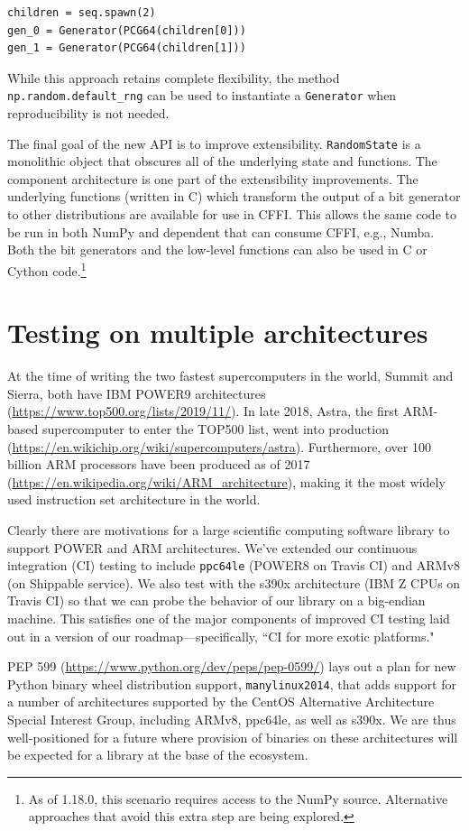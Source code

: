 \begin{lstlisting}
children = seq.spawn(2)
gen_0 = Generator(PCG64(children[0]))
gen_1 = Generator(PCG64(children[1]))
\end{lstlisting}

While this approach retains complete flexibility, the method
\texttt{np.random.default\_rng} can be used to instantiate a \texttt{Generator} when
reproducibility is not needed.

The final goal of the new API is to improve extensibility. \texttt{RandomState} is
a monolithic object that obscures all of the underlying state and functions. The
component architecture is one part of the extensibility improvements. The
underlying functions (written in C) which transform the output of a bit
generator to other distributions are available for use in CFFI. This allows the
same code to be run in both NumPy and dependent that can consume CFFI, e.g.,
Numba. Both the bit generators and the low-level functions can also be used in C
or Cython code.\footnote{As of 1.18.0, this scenario requires access to the
NumPy source. Alternative approaches that avoid this extra step are being
explored.}

\section*{Testing on multiple architectures}

At the time of writing the two fastest supercomputers in the
world, Summit and Sierra, both have IBM POWER9 architectures
(\url{https://www.top500.org/lists/2019/11/}).
In late 2018, Astra, the first ARM-based supercomputer
to enter the TOP500 list, went into production
(\url{https://en.wikichip.org/wiki/supercomputers/astra}).
Furthermore, over 100 billion ARM processors have been produced as
of 2017 (\url{https://en.wikipedia.org/wiki/ARM_architecture}),
making it the most widely used instruction set architecture
in the world.

Clearly there are motivations for a large scientific computing
software library to support POWER and ARM architectures. We've extended
our continuous integration (CI) testing to include \texttt{ppc64le}
(POWER8 on Travis CI) and ARMv8 (on Shippable service). We also test
with the s390x architecture (IBM Z CPUs on Travis CI) so that we
can probe the behavior of our library on a big-endian machine.
This satisfies one of the major components of
improved CI testing laid out in a version of our
roadmap---specifically, ``CI for more exotic
platforms."

PEP 599 (\url{https://www.python.org/dev/peps/pep-0599/})
lays out a plan for new Python binary wheel
distribution support, \texttt{manylinux2014}, that adds
support for a number of architectures supported by the CentOS
Alternative Architecture Special Interest Group, including
ARMv8, ppc64le, as well as s390x. We are thus well-positioned
for a future where provision of binaries on these architectures
will be expected for a library at the base of the ecosystem.
